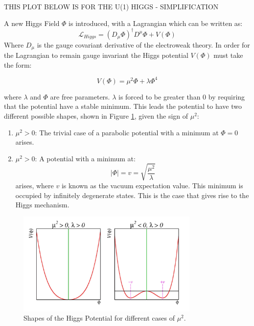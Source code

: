 THIS PLOT BELOW IS FOR THE U(1) HIGGS - SIMPLIFICATION

A new Higgs Field $\Phi$ is introduced, with a Lagrangian which can be written as:
\begin{equation}
\mathcal{L}_{Higgs} = (D_{\mu}\Phi)^{\dagger}D^{\mu}\Phi + V(\Phi)
\end{equation}
Where $D_{\mu}$ is the gauge covariant derivative of the electroweak theory. In order for the Lagrangian to remain gauge invariant the Higgs potential $V(\Phi)$ must take the form:

\begin{equation}
    V(\Phi) = {\mu}^2{\Phi} + {\lambda}{\Phi}^4
\end{equation}

where $\lambda$ and $\Phi$ are free parameters. $\lambda$ is forced to be greater than 0 by requiring that the potential have a stable minimum. This leads the potential to have two different possible shapes, shown in Figure \ref{fig:higgspot}, given the sign of $\mu^2$:

\begin{enumerate}
    \item ${\mu^2 > 0}$: The trivial case of a parabolic potential with a minimum at $\Phi = 0$ arises.
    \item ${\mu^2 > 0}$: A potential with a minimum at:
    \begin{equation}
     |\Phi| = v = \sqrt{\frac{\mu^2}{\lambda}}
    \end{equation}
     arises, where $v$ is known as the vacuum expectation value. This minimum is occupied by infinitely degenerate states. This is the case that gives rise to the Higgs mechanism.
\end{enumerate}

\begin{figure}[h]
    \centering
    \includegraphics[width=0.8\textwidth]{Figures/1/HiggsPotential.png}
    \caption{Shapes of the Higgs Potential for different cases of $\mu^2$.}
    \label{fig:higgspot}
\end{figure}

